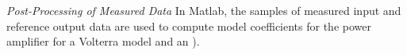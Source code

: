 \textit{Post-Processing of Measured Data}
In Matlab, the samples of measured input and reference output data are used to compute model coefficients for the power amplifier for a Volterra model and an \OMP).  
%
%



%
%


